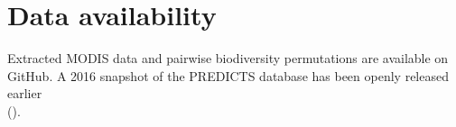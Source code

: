 \section{Data availability}
\label{C02_06}
Extracted MODIS data and pairwise biodiversity permutations are available on GitHub. A 2016 snapshot of the PREDICTS database has been openly released earlier\\ ().

\clearpage
%

%  
